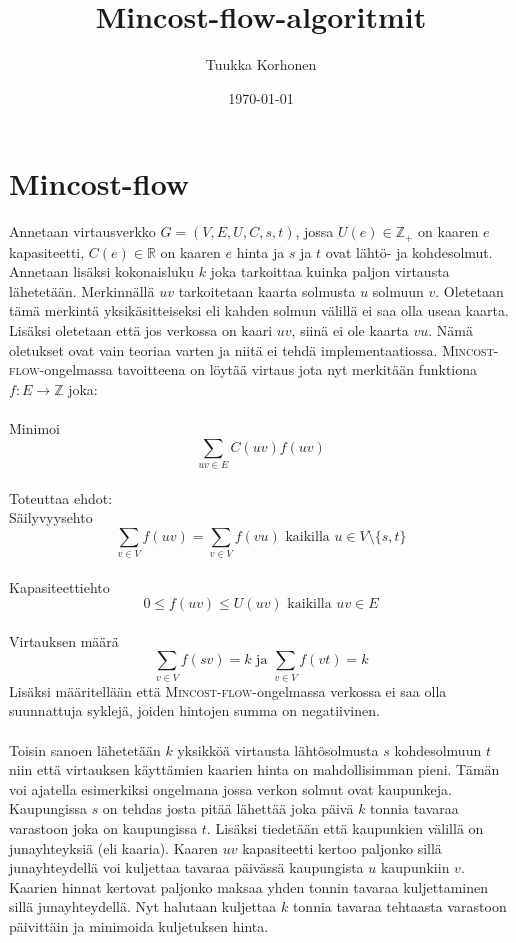 \documentclass[a4paper, 11pt]{article}
\title{Mincost-flow-algoritmit}
\author{Tuukka Korhonen}
\date{\today}
\begin{document}
\maketitle
\noindent
\section*{Mincost-flow}
Annetaan virtausverkko $G = (V, E, U, C, s, t)$, jossa $U(e) \in \mathbb{Z_+}$ on 
kaaren $e$ kapasiteetti, $C(e) \in \mathbb{R}$ on kaaren $e$ hinta ja $s$ ja $t$
ovat lähtö- ja kohdesolmut. Annetaan lisäksi kokonaisluku $k$ joka tarkoittaa
kuinka paljon virtausta lähetetään. Merkinnällä $uv$ tarkoitetaan kaarta solmusta
$u$ solmuun $v$. Oletetaan tämä merkintä yksikäsitteiseksi eli 
kahden solmun välillä ei
saa olla useaa kaarta. Lisäksi oletetaan että jos verkossa on kaari $uv$, siinä
ei ole kaarta $vu$. Nämä oletukset ovat vain teoriaa varten ja niitä ei tehdä
implementaatiossa. \textsc{Mincost-flow}-ongelmassa tavoitteena on löytää virtaus jota 
nyt merkitään funktiona
$f : E \rightarrow \mathbb{Z}$ joka: \\\\ Minimoi $$\sum_{uv \in E} C(uv) f(uv)$$\\
Toteuttaa ehdot:\\ Säilyvyysehto
$$\sum_{v \in V} f(uv) = \sum_{v \in V} f(vu) \text{ kaikilla } u \in V \setminus \{s, t\}$$
\\Kapasiteettiehto
$$0 \le f(uv) \le U(uv) \text{ kaikilla } uv \in E$$
\\Virtauksen määrä
$$\sum_{v \in V} f(sv) = k \text{ ja } \sum_{v \in V} f(vt) = k$$
Lisäksi määritellään että \textsc{Mincost-flow}-ongelmassa verkossa ei saa olla
suunnattuja syklejä, joiden hintojen summa on negatiivinen.\\\\

\noindent
Toisin sanoen lähetetään $k$ yksikköä virtausta lähtösolmusta $s$ kohdesolmuun $t$ niin
että virtauksen käyttämien kaarien hinta on mahdollisimman pieni. Tämän voi ajatella
esimerkiksi ongelmana jossa verkon solmut ovat kaupunkeja. Kaupungissa $s$ on tehdas
josta pitää lähettää joka päivä $k$ tonnia tavaraa varastoon joka on kaupungissa $t$.
Lisäksi tiedetään että kaupunkien välillä on junayhteyksiä (eli kaaria). Kaaren $uv$
kapasiteetti kertoo paljonko sillä junayhteydellä voi kuljettaa tavaraa päivässä
kaupungista $u$ kaupunkiin $v$. Kaarien hinnat kertovat paljonko maksaa yhden tonnin
tavaraa kuljettaminen sillä junayhteydellä. Nyt halutaan kuljettaa $k$ tonnia tavaraa
tehtaasta varastoon päivittäin ja minimoida  kuljetuksen hinta.\\\\
\end{document}

